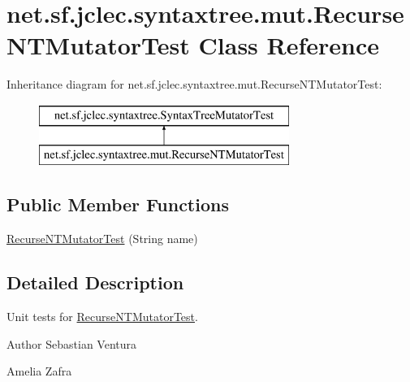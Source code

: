 \hypertarget{classnet_1_1sf_1_1jclec_1_1syntaxtree_1_1mut_1_1_recurse_n_t_mutator_test}{\section{net.\-sf.\-jclec.\-syntaxtree.\-mut.\-Recurse\-N\-T\-Mutator\-Test Class Reference}
\label{classnet_1_1sf_1_1jclec_1_1syntaxtree_1_1mut_1_1_recurse_n_t_mutator_test}
}
Inheritance diagram for net.\-sf.\-jclec.\-syntaxtree.\-mut.\-Recurse\-N\-T\-Mutator\-Test\-:\begin{figure}[H]
\begin{center}
\leavevmode
\includegraphics[height=2.000000cm]{classnet_1_1sf_1_1jclec_1_1syntaxtree_1_1mut_1_1_recurse_n_t_mutator_test}
\end{center}
\end{figure}
\subsection*{Public Member Functions}
\begin{DoxyCompactItemize}
\item 
\hyperlink{classnet_1_1sf_1_1jclec_1_1syntaxtree_1_1mut_1_1_recurse_n_t_mutator_test_a6cd0a1b9e30700fab0d8c1f7b1a26e90}{Recurse\-N\-T\-Mutator\-Test} (String name)
\end{DoxyCompactItemize}


\subsection{Detailed Description}
Unit tests for \hyperlink{classnet_1_1sf_1_1jclec_1_1syntaxtree_1_1mut_1_1_recurse_n_t_mutator_test}{Recurse\-N\-T\-Mutator\-Test}.

\begin{DoxyAuthor}{Author}
Sebastian Ventura 

Amelia Zafra 
\end{DoxyAuthor}


